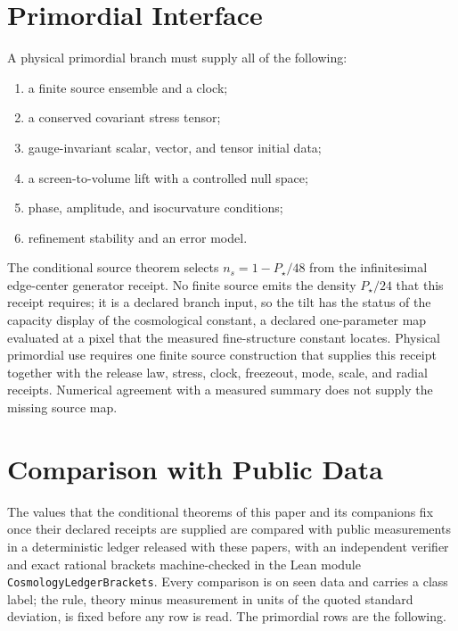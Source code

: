\documentclass[11pt]{article}
\theoremstyle{remark}
\begin{document}
\section{Primordial Interface}

A physical primordial branch must supply all of the following:
\begin{enumerate}[leftmargin=2em]
\item a finite source ensemble and a clock;
\item a conserved covariant stress tensor;
\item gauge-invariant scalar, vector, and tensor initial data;
\item a screen-to-volume lift with a controlled null space;
\item phase, amplitude, and isocurvature conditions;
\item refinement stability and an error model.
\end{enumerate}

The conditional source theorem selects \(n_s=1-P_\star/48\) from the
infinitesimal edge-center generator receipt. No finite source emits the
density \(P_\star/24\) that this receipt requires; it is a declared branch
input, so the tilt has the status of the capacity display of the
cosmological constant, a declared one-parameter map evaluated at a pixel
that the measured fine-structure constant locates. Physical primordial use requires
one finite source construction that supplies this receipt together with the release law,
stress, clock, freezeout, mode, scale, and radial receipts. Numerical agreement
with a measured summary does not supply the missing source map.

\section{Comparison with Public Data}
\label{sec:public-comparison}

The values that the conditional theorems of this paper and its companions
fix once their declared receipts are supplied are compared with public measurements in a deterministic
ledger released with these papers, with an independent verifier and exact
rational brackets machine-checked in the Lean module
\texttt{CosmologyLedgerBrackets}. Every comparison is on seen data and
carries a class label; the rule, theory minus measurement in units of the
quoted standard deviation, is fixed before any row is read. The primordial
rows are the following.
\end{document}
